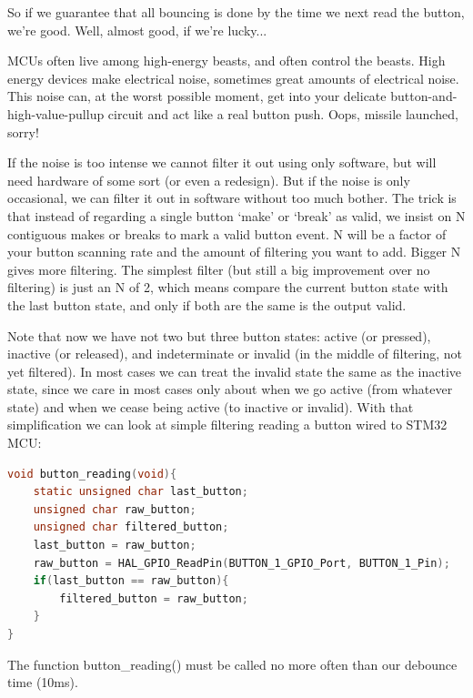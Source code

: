 So if we guarantee that all bouncing is done by the time we next read the button, we're good.  Well, almost good, if we're lucky...

MCUs often live among high-energy beasts, and often control the beasts.  High energy devices make electrical noise, sometimes great amounts of electrical noise.  This noise can, at the worst possible moment, get into your delicate button-and-high-value-pullup circuit and act like a real button push.  Oops, missile launched, sorry!

If the noise is too intense we cannot filter it out using only software, but will need hardware of some sort (or even a redesign).  But if the noise is only occasional, we can filter it out in software without too much bother.  The trick is that instead of regarding a single button `make' or `break' as valid, we insist on N contiguous makes or breaks to mark a valid button event.  N will be a factor of your button scanning rate and the amount of filtering you want to add.  Bigger N gives more filtering.  The simplest filter (but still a big improvement over no filtering) is just an N of 2, which means compare the current button state with the last button state, and only if both are the same is the output valid.

Note that now we have not two but three button states: active (or pressed), inactive (or released), and indeterminate or invalid (in the middle of filtering, not yet filtered).  In most cases we can treat the invalid state the same as the inactive state, since we care in most cases only about when we go active (from whatever state) and when we cease being active (to inactive or invalid).  With that simplification we can look at simple  filtering reading a button wired to STM32 MCU:
\begin{lstlisting}[caption=Read port pin and deboucing,language=C]
void button_reading(void){
    static unsigned char last_button;
    unsigned char raw_button;
    unsigned char filtered_button;
    last_button = raw_button;
    raw_button = HAL_GPIO_ReadPin(BUTTON_1_GPIO_Port, BUTTON_1_Pin);
    if(last_button == raw_button){
        filtered_button = raw_button;
    }
}
\end{lstlisting}

The function button\_reading() must be called no more often than our debounce time (10ms).

